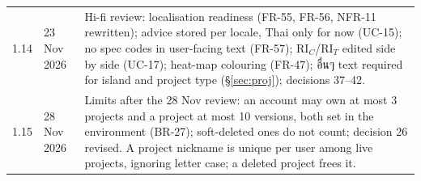 \documentclass[11pt,a4paper]{article}
\newcommand{\thai}[1]{{\thaifont #1}}
\newcommand{\RIC}{\mathrm{RI}_{C}}
\newcommand{\RIT}{\mathrm{RI}_{T}}
\begin{document}
\begin{tabularx}{\linewidth}{@{}l l Y@{}}
1.14 & 23 Nov 2026 & Hi-fi review: localisation readiness (FR-55, FR-56, NFR-11 rewritten); advice stored per locale, Thai only for now (UC-15); no spec codes in user-facing text (FR-57); $\RIC$/$\RIT$ edited side by side (UC-17); heat-map colouring (FR-47); \thai{อื่นๆ} text required for island and project type (\S\ref{sec:proj}); decisions 37--42. \\
1.15 & 28 Nov 2026 & Limits after the 28 Nov review: an account may own at most 3 projects and a project at most 10 versions, both set in the environment (BR-27); soft-deleted ones do not count; decision 26 revised. A project nickname is unique per user among live projects, ignoring letter case; a deleted project frees it. \\
\bottomrule
\end{tabularx}
\end{document}
